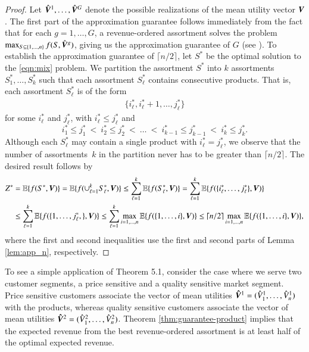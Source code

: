 \begin{proof} 
Let $\hat{{\bm V}}^1,\ldots,\hat{{\bm V}}^G$ denote the possible realizations of the mean utility vector ${\bm V}$.  The first part of the approximation guarantee follows immediately from the fact that for each $g = 1, \ldots, G$,  a revenue-ordered assortment solves the problem 
$\max_{S \subseteq \{1,\ldots,n\}} f(S,\hat{{\bm V}}^g)$, giving us the approximation guarantee of $G$ (see \cite{TalluriVanRyzin:2004}).
To establish the approximation guarantee of $\lceil n/2 \rceil$, let $S^*$ be the optimal solution to the \ref{eqn:mix} problem. We partition the assortment $S^*$ into $k$ assortments $S_1^*,\ldots,S_k^*$ such that each assortment $S_\ell^*$ contains consecutive products. That is, each assortment $S_\ell^*$ is of the form 
%
%
\begin{align*}
\{ i_\ell^*, i_\ell^* + 1, \ldots, j_\ell^*\}
\end{align*}
%
%
for some $i_\ell^*$ and $j_\ell^*$, with $i_\ell^* \leq j_\ell^*$ and  
$$
	i_1^* \leq j_1^* ~<~ i_2^* \leq j_2^* ~<~  \ldots ~<~ i_{k-1}^* \leq j_{k-1}^* ~<~ i_k^* \leq j_k^*.
$$
Although each $S_\ell^*$ may contain a single product with $i_\ell^* = j_\ell^*$, we observe that the number of assortments~$k$ in the partition never has to be greater than $\lceil n /2 \rceil$.  The desired result follows by 
%
%
\begin{align*}
Z^* 
& = \mathbb E \{ f(S^* , {\bm V} )\} 
= 
\mathbb E \{ f(\cup_{\ell=1}^k S_\ell^* , {\bm V} ) \}
\leq 
\sum_{\ell=1}^k \mathbb E \{ f(S_\ell^* , {\bm V} ) \}
=
\sum_{\ell=1}^k \mathbb E \{ f(\{i_\ell^*, \ldots,j_\ell^* \} , {\bm V}) \} 
\\
& \leq
\sum_{\ell=1}^k \mathbb E \{ f(\{1,\ldots,j_\ell^* ,\} , {\bm V}) \} 
\leq
\sum_{\ell=1}^k \max_{i = 1,\ldots,n } \mathbb E \{ f(\{1,\ldots,i\} , {\bm V} ) \}
\leq
\lceil n / 2 \rceil \max_{i=1,\ldots,n} \mathbb E \{ f(\{1,\ldots,i\} , {\bm V}) \},
\end{align*}
%
%
where the first and second inequalities use  the first and second parts of Lemma \ref{lem:app_n}, respectively.
\end{proof}

To see a simple application of Theorem 5.1, consider the case where we serve two customer segments, a price sensitive and a quality sensitive market segment. Price sensitive customers associate the vector of mean utilities $\bm \hat {{\bm V}}^1 = ( \hat{V}_1^1,\ldots, \hat{V}_n^1)$ with the products, whereas quality sensitive customers associate the vector of mean utilities  $\bm \hat {{\bm V}}^2 = ( \hat{V}_1^2,\ldots, \hat{V}_n^2)$. Theorem \ref{thm:guarantee-product} implies that the expected revenue from the best revenue-ordered assortment is at least half of the optimal expected revenue.

